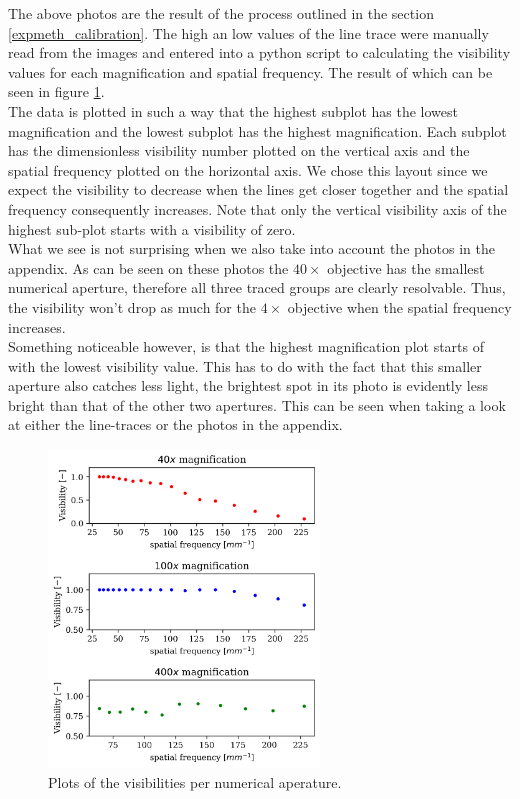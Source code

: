 The above photos are the result of the process outlined in the section \ref{expmeth_calibration}. The high an low values of the line trace were manually read from the images and entered into a python script to calculating the visibility values for each magnification and spatial frequency. The result of which can be seen in figure \ref{fig:visibilities}.\\
The data is plotted in such a way that the highest subplot has the lowest magnification and the lowest subplot has the highest magnification. Each subplot has the dimensionless visibility number plotted on the vertical axis and the spatial frequency plotted on the horizontal axis. We chose this layout since we expect the visibility to decrease when the lines get closer together and the spatial frequency consequently increases. Note that only the vertical visibility axis of the highest sub-plot starts with a visibility of zero.\\
What we see is not surprising when we also take into account the photos in the appendix. As can be seen on these photos the $40\times$ objective has the smallest numerical aperture, therefore all three traced groups are clearly resolvable. Thus, the visibility won't drop as much for the $4\times$ objective when the spatial frequency increases.\\
Something noticeable however, is that the highest magnification plot starts of with the lowest visibility value. This has to do with the fact that this smaller aperture also catches less light, the brightest spot in its photo is evidently less bright than that of the other two apertures. This can be seen when taking a look at either the line-traces or the photos in the appendix.

\begin{figure}[h!]
    \centering
    \includegraphics[width=7.2cm,keepaspectratio]{afbeeldingen/visibilities.png}
    \caption{Plots of the visibilities per numerical aperature.}
    \label{fig:visibilities}
\end{figure}

